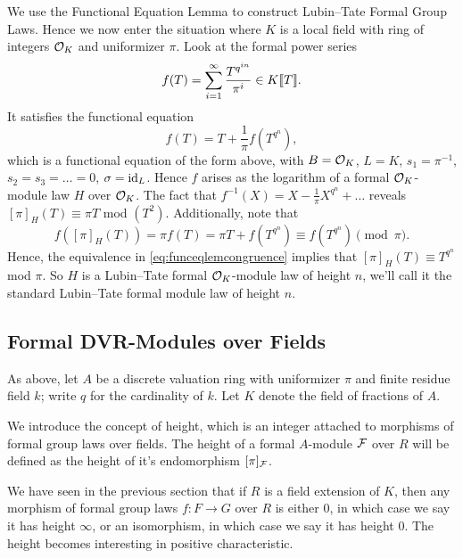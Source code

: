 \documentclass[../main.tex]{subfiles}
\begin{document}
We use the Functional Equation Lemma to construct Lubin--Tate Formal Group Laws. 
Hence we now enter the situation where $K$ is a local field with ring of integers
$\mathcal{O}_K$ and uniformizer $\pi$. Look at the formal power series
\begin{equation*}
  f(T) = \sum_{i=1}^\infty \frac{T^{q^{in}}}{\pi^i} \in K\llbracket T \rrbracket.
\end{equation*}
It satisfies the functional equation
\begin{equation*}
  f(T) = T + \frac 1\pi f(T^{q^n}),
\end{equation*}
which is a functional equation of the form above, with 
$B = \mathcal{O}_K$, $L = K$, $s_1 = \pi^{-1}$, $s_2 = s_3 = \dots = 0$, $\sigma = \operatorname{id}_L$. 
Hence $f$ arises as the logarithm of a formal $\mathcal{O}_K$-module law $H$ over $\mathcal{O}_K$.
The fact that $f^{-1}(X) = X - \frac 1\pi X^{q^n} + \dots$ reveals
$[\pi]_H(T) \equiv \pi T$ mod $(T^2)$. Additionally, note that 
\begin{equation*}
  f([\pi]_H(T)) = \pi f(T) = \pi T + f(T^{q^n}) \equiv f(T^{q^n}) \pmod \pi.
\end{equation*}
Hence, the equivalence in \eqref{eq:funceqlemcongruence} implies that 
$[\pi]_H(T) \equiv T^{q^n}$ mod $\pi$. So $H$ is a Lubin--Tate formal $\mathcal{O}_K$-module
law of height $n$, we'll call it the standard Lubin--Tate formal module law of
height $n$. 



\subsection{Formal DVR-Modules over Fields} %
\label{sub:Formal DVR-Modules over Fields}
As above, let $A$ be a discrete valuation ring with uniformizer $\pi$ and finite 
residue field $k$; write $q$ for the cardinality of $k$. Let $K$ denote the
field of fractions of $A$.

We introduce the concept of height, which is an integer attached to
morphisms of formal group laws over fields. The height of a formal $A$-module
$\mathcal{F}$ over $R$ will be defined as the height of it's endomorphism $[\pi]_{\mathcal{F}}$. 

We have seen in the previous section that if $R$ is a field extension of $K$,
then any morphism of formal group laws $f: F \to G$ over $R$ is either $0$, in
which case we say it has height $\infty$, or an isomorphism, in which case we
say it has height $0$. The height becomes interesting in positive
characteristic. 
\end{document}
